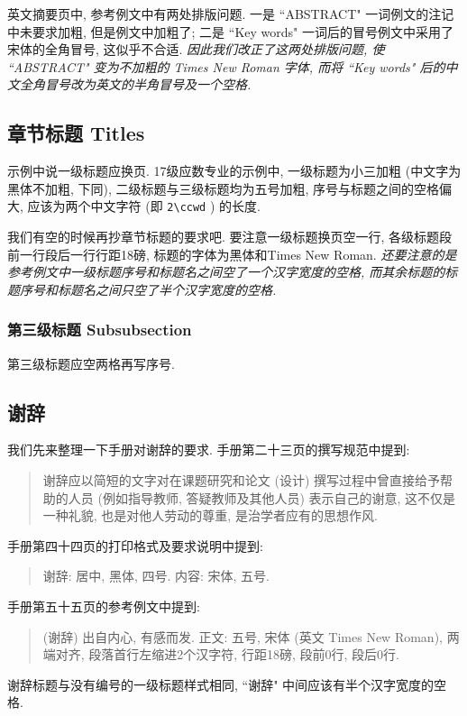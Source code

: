 英文摘要页中, 参考例文中有两处排版问题. 一是 ``ABSTRACT" 一词例文的注记中未要求加粗, 但是例文中加粗了; 二是 ``Key words" 一词后的冒号例文中采用了宋体的全角冒号, 这似乎不合适. \emph{因此我们改正了这两处排版问题, 使 ``ABSTRACT" 变为不加粗的 Times New Roman 字体, 而将 ``Key words" 后的中文全角冒号改为英文的半角冒号及一个空格.}

\subsection{章节标题 Titles}

示例中说一级标题应换页. 17级应数专业的示例中, 一级标题为小三加粗 (中文字为黑体不加粗, 下同), 二级标题与三级标题均为五号加粗, 序号与标题之间的空格偏大, 应该为两个中文字符 (即 \verb|2\ccwd| ) 的长度.

我们有空的时候再抄章节标题的要求吧. 要注意一级标题换页空一行, 各级标题段前一行段后一行行距18磅, 标题的字体为黑体和Times New Roman. \emph{还要注意的是参考例文中一级标题序号和标题名之间空了一个汉字宽度的空格, 而其余标题的标题序号和标题名之间只空了半个汉字宽度的空格.}

\subsubsection{第三级标题 Subsubsection}

第三级标题应空两格再写序号.

\zhlipsum[1]

\subsection{谢辞}

我们先来整理一下手册对谢辞的要求. 手册第二十三页的撰写规范中提到:
\begin{quote}
  谢辞应以简短的文字对在课题研究和论文 (设计) 撰写过程中曾直接给予帮助的人员 (例如指导教师, 答疑教师及其他人员) 表示自己的谢意, 这不仅是一种礼貌, 也是对他人劳动的尊重, 是治学者应有的思想作风.
\end{quote}
手册第四十四页的打印格式及要求说明中提到:
\begin{quote}
  谢辞: 居中, 黑体, 四号.
  内容: 宋体, 五号.
\end{quote}
手册第五十五页的参考例文中提到:
\begin{quote}
  (谢辞) 出自内心, 有感而发. 正文: 五号, 宋体 (英文 Times New Roman), 两端对齐, 段落首行左缩进2个汉字符, 行距18磅, 段前0行, 段后0行.
\end{quote}

谢辞标题与没有编号的一级标题样式相同, ``谢辞" 中间应该有半个汉字宽度的空格.

